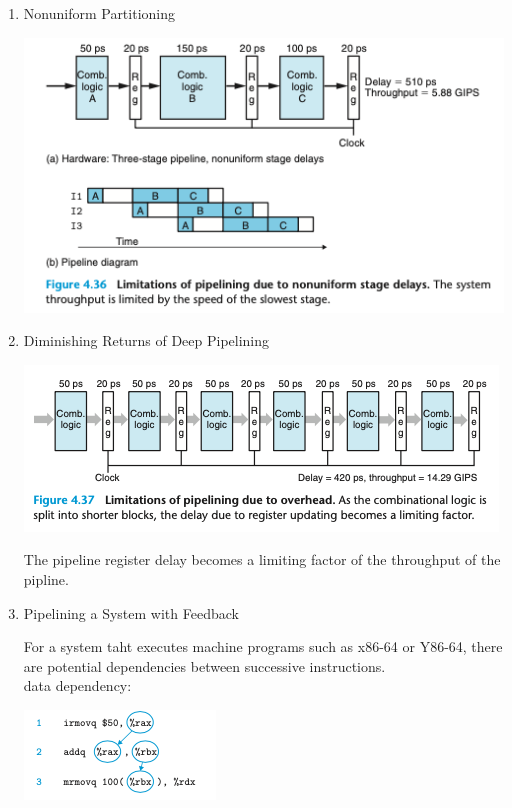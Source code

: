\documentclass[11pt]{article}
\begin{document}
\begin{enumerate}
\item Nonuniform Partitioning
\label{sec:org402a900}

\begin{center}
\includegraphics[width=.9\linewidth]{pics/figure4.36-limitations-of-pipelining-duo-to-uniform-stage-delays.png}
\end{center}


\item Diminishing Returns of Deep Pipelining
\label{sec:orgc1020b9}

\begin{center}
\includegraphics[width=.9\linewidth]{pics/figure4.37-limitations-of-pipeline-due-to-overhead.png}
\end{center}

The pipeline register delay becomes a limiting factor of the throughput of the pipline.\\

\item Pipelining a System with Feedback
\label{sec:org91678fd}

For a system taht executes machine programs such as x86-64 or Y86-64, there are potential dependencies between successive instructions.\\

data dependency:\\

\begin{center}
\includegraphics[width=.9\linewidth]{pics/instruction-dependencies.png}
\end{center}


\end{enumerate}
\end{document}
